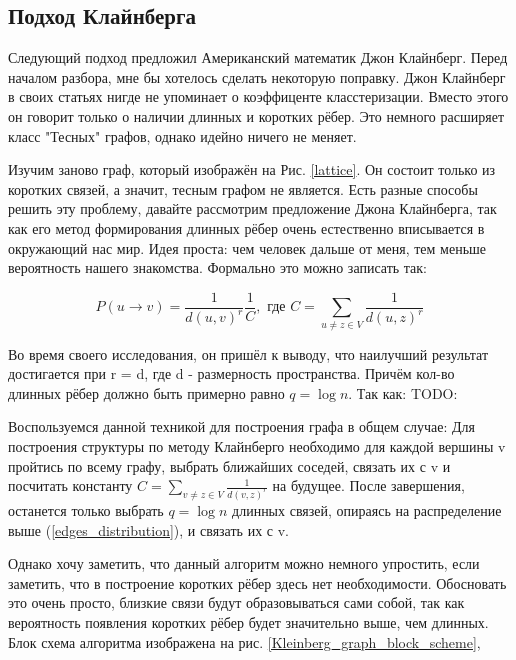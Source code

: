 \subsection{Подход Клайнберга}

Следующий подход предложил Американский математик Джон Клайнберг. Перед началом разбора,
мне бы хотелось сделать некоторую поправку. Джон Клайнберг в своих статьях нигде не 
упоминает о коэффиценте класстеризации. Вместо этого он говорит только о наличии длинных
и коротких рёбер. Это немного расширяет класс "Тесных" графов, однако идейно 
ничего не меняет.

    Изучим заново граф, который изображён на Рис. \ref{lattice}. Он состоит только из
коротких связей, а значит, тесным графом не является. Есть разные способы решить эту проблему,
давайте рассмотрим предложение Джона Клайнберга, так как его метод формирования длинных
рёбер очень естественно вписывается в окружающий нас мир. Идея проста: чем человек дальше от меня, тем меньше
вероятность нашего знакомства. Формально это можно записать так:

\begin{equation} \label{edges_distribution}
    P(u \rightarrow v) = \frac{1}{d(u, v)^r}\frac{1}{C}, \text{ где } C = \sum_{u \neq z \in V}\frac{1}{d(u, z)^r}
\end{equation}

Во время своего исследования, он пришёл к выводу, что наилучший результат достигается при 
r = d, где d - размерность пространства. Причём кол-во длинных рёбер должно быть 
примерно равно $q = \log{n}$. Так как: TODO:

Воспользуемся данной техникой для построения графа в общем случае: Для построения структуры 
по методу Клайнберго необходимо для каждой вершины v пройтись по всему графу, выбрать ближайших
соседей, связать их с v и посчитать константу $C = \sum_{v \neq z \in V}\frac{1}{d(v, z)^r}$ на будущее.
После завершения, останется только выбрать $q = \log{n}$ длинных связей, опираясь на распределение выше 
(\ref{edges_distribution}), и связать их с v.

Однако хочу заметить, что данный алгоритм можно немного упростить, если заметить, что в
построение коротких рёбер здесь нет необходимости. Обосновать это очень просто, близкие связи
будут образовываться сами собой, так как вероятность появления коротких рёбер будет значительно выше, 
чем длинных. Блок схема алгоритма изображена на рис. \ref{Kleinberg_graph_block_scheme}, 

